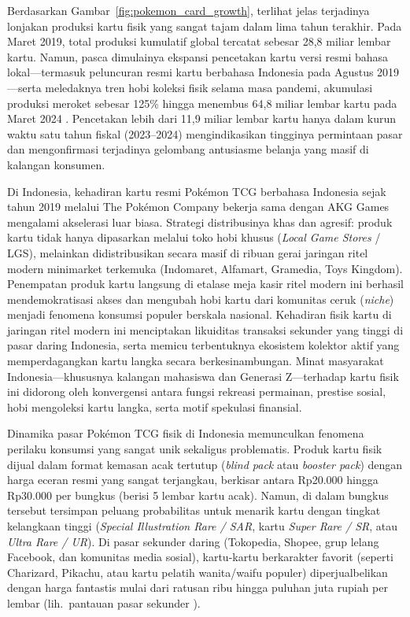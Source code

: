 \documentclass[12pt,a4paper]{article}
\numberwithin{equation}{section}
\numberwithin{table}{section}
\numberwithin{figure}{section}
\begin{document}
Berdasarkan Gambar~\ref{fig:pokemon_card_growth}, terlihat jelas terjadinya lonjakan produksi kartu fisik yang sangat tajam dalam lima tahun terakhir. Pada Maret 2019, total produksi kumulatif global tercatat sebesar 28,8 miliar lembar kartu. Namun, pasca dimulainya ekspansi pencetakan kartu versi resmi bahasa lokal—termasuk peluncuran resmi kartu berbahasa Indonesia pada Agustus 2019—serta meledaknya tren hobi koleksi fisik selama masa pandemi, akumulasi produksi meroket sebesar 125\% hingga menembus 64,8 miliar lembar kartu pada Maret 2024 \citep{pokemoncompany2024}. Pencetakan lebih dari 11,9 miliar lembar kartu hanya dalam kurun waktu satu tahun fiskal (2023--2024) mengindikasikan tingginya permintaan pasar dan mengonfirmasi terjadinya gelombang antusiasme belanja yang masif di kalangan konsumen.

Di Indonesia, kehadiran kartu resmi Pok\'emon TCG berbahasa Indonesia sejak tahun 2019 melalui The Pok\'emon Company bekerja sama dengan AKG Games mengalami akselerasi luar biasa. Strategi distribusinya khas dan agresif: produk kartu tidak hanya dipasarkan melalui toko hobi khusus (\emph{Local Game Stores} / LGS), melainkan didistribusikan secara masif di ribuan gerai jaringan ritel modern minimarket terkemuka (Indomaret, Alfamart, Gramedia, Toys Kingdom). Penempatan produk kartu langsung di etalase meja kasir ritel modern ini berhasil mendemokratisasi akses dan mengubah hobi kartu dari komunitas ceruk (\emph{niche}) menjadi fenomena konsumsi populer berskala nasional. Kehadiran fisik kartu di jaringan ritel modern ini menciptakan likuiditas transaksi sekunder yang tinggi di pasar daring Indonesia, serta memicu terbentuknya ekosistem kolektor aktif yang memperdagangkan kartu langka secara berkesinambungan. Minat masyarakat Indonesia—khususnya kalangan mahasiswa dan Generasi Z—terhadap kartu fisik ini didorong oleh konvergensi antara fungsi rekreasi permainan, prestise sosial, hobi mengoleksi kartu langka, serta motif spekulasi finansial.

Dinamika pasar Pok\'emon TCG fisik di Indonesia memunculkan fenomena perilaku konsumsi yang sangat unik sekaligus problematis. Produk kartu fisik dijual dalam format kemasan acak tertutup (\emph{blind pack} atau \emph{booster pack}) dengan harga eceran resmi yang sangat terjangkau, berkisar antara Rp20.000 hingga Rp30.000 per bungkus (berisi 5 lembar kartu acak). Namun, di dalam bungkus tersebut tersimpan peluang probabilitas untuk menarik kartu dengan tingkat kelangkaan tinggi (\emph{Special Illustration Rare / SAR}, kartu \emph{Super Rare / SR}, atau \emph{Ultra Rare / UR}). Di pasar sekunder daring (Tokopedia, Shopee, grup lelang Facebook, dan komunitas media sosial), kartu-kartu berkarakter favorit (seperti Charizard, Pikachu, atau kartu pelatih wanita/waifu populer) diperjualbelikan dengan harga fantastis mulai dari ratusan ribu hingga puluhan juta rupiah per lembar (lih.\ pantauan pasar sekunder \citep{pricecharting2024}).
\end{document}
